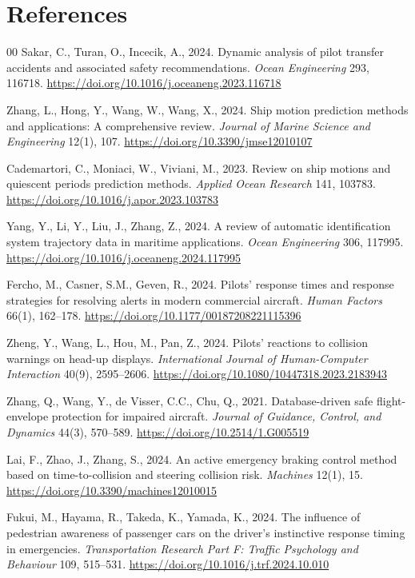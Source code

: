 \documentclass[preprint,12pt]{elsarticle}
\begin{document}
\section*{References}
\begin{thebibliography}{00}
Sakar, C., Turan, O., Incecik, A., 2024.
Dynamic analysis of pilot transfer accidents and associated safety recommendations.
\emph{Ocean Engineering} 293, 116718.
\url{https://doi.org/10.1016/j.oceaneng.2023.116718}

Zhang, L., Hong, Y., Wang, W., Wang, X., 2024.
Ship motion prediction methods and applications: A comprehensive review.
\emph{Journal of Marine Science and Engineering} 12(1), 107.
\url{https://doi.org/10.3390/jmse12010107}

Cademartori, C., Moniaci, W., Viviani, M., 2023.
Review on ship motions and quiescent periods prediction methods.
\emph{Applied Ocean Research} 141, 103783.
\url{https://doi.org/10.1016/j.apor.2023.103783}

Yang, Y., Li, Y., Liu, J., Zhang, Z., 2024.
A review of automatic identification system trajectory data in maritime applications.
\emph{Ocean Engineering} 306, 117995.
\url{https://doi.org/10.1016/j.oceaneng.2024.117995}

Fercho, M., Casner, S.M., Geven, R., 2024.
Pilots' response times and response strategies for resolving alerts in modern commercial aircraft.
\emph{Human Factors} 66(1), 162--178.
\url{https://doi.org/10.1177/00187208221115396}

Zheng, Y., Wang, L., Hou, M., Pan, Z., 2024.
Pilots' reactions to collision warnings on head-up displays.
\emph{International Journal of Human-Computer Interaction} 40(9), 2595--2606.
\url{https://doi.org/10.1080/10447318.2023.2183943}

Zhang, Q., Wang, Y., de Visser, C.C., Chu, Q., 2021.
Database-driven safe flight-envelope protection for impaired aircraft.
\emph{Journal of Guidance, Control, and Dynamics} 44(3), 570--589.
\url{https://doi.org/10.2514/1.G005519}

Lai, F., Zhao, J., Zhang, S., 2024.
An active emergency braking control method based on time-to-collision and steering collision risk.
\emph{Machines} 12(1), 15.
\url{https://doi.org/10.3390/machines12010015}

Fukui, M., Hayama, R., Takeda, K., Yamada, K., 2024.
The influence of pedestrian awareness of passenger cars on the driver's instinctive response timing in emergencies.
\emph{Transportation Research Part F: Traffic Psychology and Behaviour} 109, 515--531.
\url{https://doi.org/10.1016/j.trf.2024.10.010}


\end{thebibliography}
\end{document}

